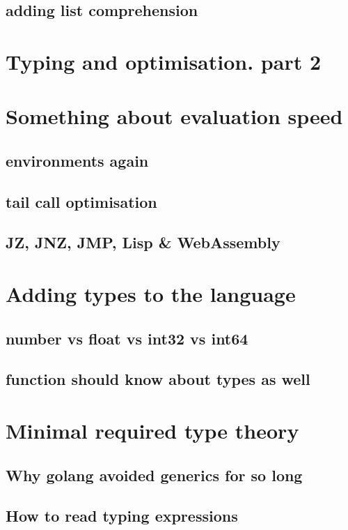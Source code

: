 \documentclass[11pt]{article}
\begin{document}
\subsection{adding list comprehension}
\label{sec:org79c7f02}
\section{Typing and optimisation. part 2}
\label{sec:orge109518}
\section{Something about evaluation speed}
\label{sec:orgde5f8cc}

\subsection{environments again}
\label{sec:orgfd4dc72}
\subsection{tail call optimisation}
\label{sec:org81145f6}
\subsection{JZ, JNZ, JMP, Lisp \& WebAssembly}
\label{sec:org5aaa4fe}
\section{Adding types to the language}
\label{sec:org3762864}
\subsection{number vs float vs int32 vs int64}
\label{sec:org644ad94}
\subsection{function should know about types as well}
\label{sec:org7b26251}
\section{Minimal required type theory}
\label{sec:orgf5dda42}
\subsection{Why golang avoided generics for so long}
\label{sec:org822f2fa}
\subsection{How to read typing expressions}
\label{sec:orgbc381c9}
\end{document}
